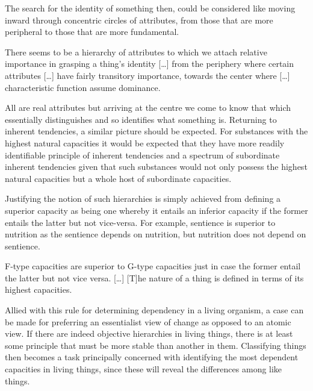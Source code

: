 The search for the identity of something then, could be considered like moving inward through concentric circles of attributes, from those that are more peripheral to those that are more fundamental.
\begin{quoting}
There seems to be a hierarchy of attributes to which we attach relative importance in grasping a thing's identity [\ldots] from the periphery where certain attributes [\ldots] have fairly transitory importance, towards the center where [\ldots] characteristic function assume dominance. \parencite[][79]{Oderberg2005-ODEHD}
\end{quoting}
All are real attributes but arriving at the centre we come to know that which essentially distinguishes and so identifies what something is. Returning to inherent tendencies, a similar picture should be expected. For substances with the highest natural capacities it would be expected that they have more readily identifiable principle of inherent tendencies and a spectrum of subordinate inherent tendencies given that such substances would not only possess the highest natural capacities but a whole host of subordinate capacities.

Justifying the notion of such hierarchies is simply achieved from defining a superior capacity as being one whereby it entails an inferior capacity if the former entails the latter but not vice-versa. For example, sentience is superior to nutrition as the sentience depends on nutrition, but nutrition does not depend on sentience.
\begin{quoting}
F-type capacities are superior to G-type capacities just in case the former entail the latter but not vice versa. [\ldots] [T]he nature of a thing is defined in terms of its highest capacities.
\parencite[][88]{Oderberg2005-ODEHD}
\end{quoting}

Allied with this rule for determining dependency in a living organism, a case can be made for preferring an essentialist view of change as opposed to an atomic view. If there are indeed objective hierarchies in living things, there is at least some principle that must be more stable than another in them. Classifying things then becomes a task principally concerned with identifying the most dependent capacities in living things, since these will reveal the differences among like things.

